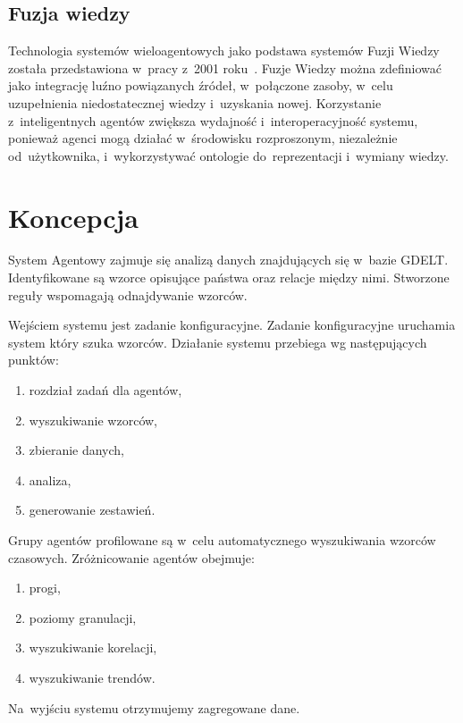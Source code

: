 \documentclass[11pt]{report}
\begin{document}
    \section{Fuzja wiedzy}

    Technologia systemów wieloagentowych jako podstawa systemów Fuzji Wiedzy została przedstawiona w~pracy z~2001 roku~\cite{Smirnov2002}.
    Fuzje Wiedzy można zdefiniować jako integrację luźno powiązanych źródeł, w~połączone zasoby, w~celu uzupełnienia niedostatecznej wiedzy i~uzyskania nowej.
    Korzystanie z~inteligentnych agentów zwiększa wydajność i~interoperacyjność systemu, ponieważ agenci mogą działać w~środowisku rozproszonym,
    niezależnie od~użytkownika, i~wykorzystywać ontologie do~reprezentacji i~wymiany wiedzy.


    \chapter{Koncepcja}\label{ch:koncepcja}
    System Agentowy zajmuje się analizą danych znajdujących się w~bazie GDELT\@.
    Identyfikowane są wzorce opisujące państwa oraz relacje między nimi.
    Stworzone reguły wspomagają odnajdywanie wzorców.

    Wejściem systemu jest zadanie konfiguracyjne.
    Zadanie konfiguracyjne uruchamia system który szuka wzorców.
    Działanie systemu przebiega wg następujących punktów:
    \begin{enumerate}
        \item rozdział zadań dla agentów,
        \item wyszukiwanie wzorców,
        \item zbieranie danych,
        \item analiza,
        \item generowanie zestawień.
    \end{enumerate}

    Grupy agentów profilowane są w~celu automatycznego wyszukiwania wzorców czasowych.
    Zróżnicowanie agentów obejmuje:
    \begin{enumerate}
        \item progi,
        \item poziomy granulacji,
        \item wyszukiwanie korelacji,
        \item wyszukiwanie trendów.
    \end{enumerate}

    Na~wyjściu systemu otrzymujemy zagregowane dane.
\end{document}
